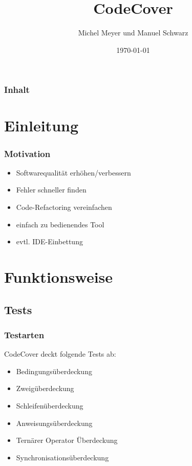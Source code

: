 \documentclass{beamer}
\begin{document}
  \title[CodeCover\hspace{105mm}\insertframenumber/\inserttotalframenumber]{CodeCover}
  \author{Michel Meyer und Manuel Schwarz}
  \date{\today}

  \begin{frame}
    \titlepage
  \end{frame}

  \begin{frame}\frametitle{Inhalt}\tableofcontents
  \end{frame}


  \section{Einleitung}
  \begin{frame}\frametitle{Motivation}
    \begin{itemize}
      \item Softwarequalität erhöhen/verbessern
      \item Fehler schneller finden
      \item Code-Refactoring vereinfachen
      \item einfach zu bedienendes Tool
      \item evtl. IDE-Einbettung
    \end{itemize}
  \end{frame}

  \section{Funktionsweise}
  \subsection{Tests}
  \begin{frame}\frametitle{Testarten}
  CodeCover deckt folgende Tests ab:
    \begin{itemize}
      \item Bedingungsüberdeckung
      \item Zweigüberdeckung
      \item Schleifenüberdeckung
      \item Anweisungsüberdeckung
      \item Ternärer Operator Überdeckung
      \item Synchronisationsüberdeckung
    \end{itemize}
  \end{frame}
\end{document}
